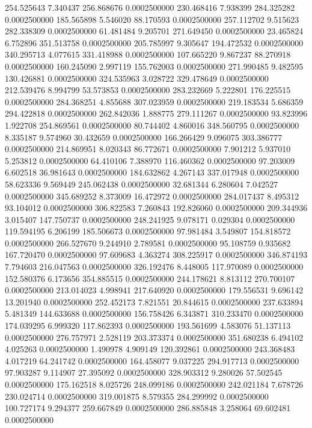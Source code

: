 254.525643 7.340437 256.868676 0.0002500000
230.468416 7.938399 284.325282 0.0002500000
185.565898 5.546020 88.170593 0.0002500000
257.112702 9.515623 282.338309 0.0002500000
61.481484 9.205701 271.649450 0.0002500000
23.465824 6.752896 351.513758 0.0002500000
205.785997 9.305647 194.472532 0.0002500000
340.295713 4.077615 331.418988 0.0002500000
107.665220 9.867237 88.270918 0.0002500000
160.245090 2.997119 155.762003 0.0002500000
271.990485 9.482595 130.426881 0.0002500000
324.535963 3.028722 329.478649 0.0002500000
212.539476 8.994799 53.573853 0.0002500000
283.232669 5.222801 176.225515 0.0002500000
284.368251 4.855688 307.023959 0.0002500000
219.183534 5.686359 294.422818 0.0002500000
262.842036 1.888775 279.111267 0.0002500000
93.823996 1.922708 254.869561 0.0002500000
80.744402 4.860016 348.560795 0.0002500000
8.335187 9.574960 30.432659 0.0002500000
166.266429 9.096075 303.386777 0.0002500000
214.869951 8.020343 86.772671 0.0002500000
7.901212 5.937010 5.253812 0.0002500000
64.410106 7.388970 116.460362 0.0002500000
97.203009 6.602518 36.981643 0.0002500000
184.632862 4.267143 337.017948 0.0002500000
58.623336 9.569449 245.062438 0.0002500000
32.681344 6.280604 7.042527 0.0002500000
345.689252 8.373009 16.472972 0.0002500000
284.017437 8.495312 93.104012 0.0002500000
306.822583 7.260843 192.826060 0.0002500000
209.344936 3.015407 147.750737 0.0002500000
248.241925 9.078171 0.029304 0.0002500000
119.594195 6.206199 185.506673 0.0002500000
97.981484 3.549807 154.818572 0.0002500000
266.527670 9.244910 2.789581 0.0002500000
95.108759 0.935682 167.720470 0.0002500000
97.609683 4.363274 308.225917 0.0002500000
346.874193 7.794603 216.047563 0.0002500000
326.192476 8.448005 117.970089 0.0002500000
152.580376 6.173656 354.885515 0.0002500000
244.178621 8.813112 270.700107 0.0002500000
213.014023 4.998941 217.640920 0.0002500000
179.556531 9.696142 13.201940 0.0002500000
252.452173 7.821551 20.844615 0.0002500000
237.633894 5.481349 144.633688 0.0002500000
156.758426 6.343871 310.233470 0.0002500000
174.039295 6.999320 117.862393 0.0002500000
193.561699 4.583076 51.137113 0.0002500000
276.757971 2.528119 203.373374 0.0002500000
351.680238 6.494102 4.025263 0.0002500000
1.490978 4.909149 120.392861 0.0002500000
243.368483 4.017219 64.241742 0.0002500000
164.458077 9.037225 294.917713 0.0002500000
97.903287 9.114907 27.395092 0.0002500000
328.903312 9.280026 57.502545 0.0002500000
175.162518 8.025726 248.099186 0.0002500000
242.021184 7.678726 230.024714 0.0002500000
319.001875 8.579355 284.299992 0.0002500000
100.727174 9.294377 259.667849 0.0002500000
286.885848 3.258064 69.602481 0.0002500000
